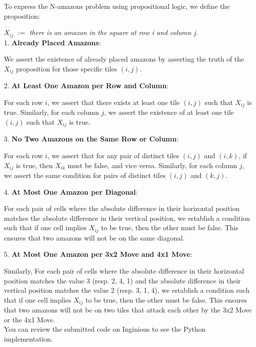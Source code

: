 \documentclass[11pt,a4paper]{report}
\begin{document}
\begin{answers}[10cm]
\small
{
To express the N-amazons problem using propositional logic, we define the proposition:\par
$X_{ij}$ $:=$ \textit{there is an amazon in the square at row i and column j}. \\

1. \textbf{Already Placed Amazons}:\par 
We assert the existence of already placed amazons by asserting the truth of the $X_{ij}$ proposition for those specific tiles $(i, j)$.

2. \textbf{At Least One Amazon per Row and Column}:\par 
For each row $i$, we assert that there exists at least one tile $(i, j)$ such that $X_{ij}$ is true. Similarly, for each column $j$, we assert the existence of at least one tile $(i, j)$ such that $X_{ij}$ is true.

3. \textbf{No Two Amazons on the Same Row or Column}:\par 
For each row $i$, we assert that for any pair of distinct tiles $(i, j)$ and $(i, k)$, if $X_{ij}$ is true, then $X_{ik}$ must be false, and vice versa. Similarly, for each column $j$, we assert the same condition for pairs of distinct tiles $(i, j)$ and $(k, j)$.

4. \textbf{At Most One Amazon per Diagonal}:\par
For each pair of cells where the absolute difference in their horizontal position matches the absolute difference in their vertical position, we establish a condition such that if one cell implies $X_{ij}$ to be true, then the other must be false. This ensures that two amazons will not be on the same diagonal.

5. \textbf{At Most One Amazon per 3x2 Move and 4x1 Move}:\par Similarly, For each pair of cells where the absolute difference in their horizontal position matches the value 3 (resp. 2, 4, 1) and the absolute difference in their vertical position matches the value 2 (resp. 3, 1, 4), we establish a condition such that if one cell implies $X_{ij}$ to be true, then the other must be false. This ensures that two amazons will not be on two tiles that attack each other by the 3x2 Move or the 4x1 Move. \\

You can review the submitted code on Inginious to see the Python implementation.
}
\end{answers}
\newpage
\end{document}
